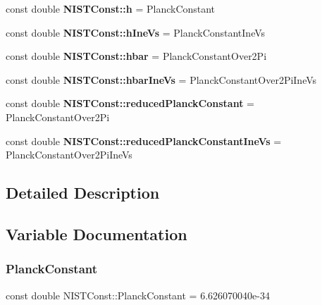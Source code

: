 \begin{DoxyCompactItemize}
\item 
\mbox{\label{group___planck_constant_ga772638524d12d0e8a63abb25441f87a9}} 
const double {\bfseries N\+I\+S\+T\+Const\+::h} = Planck\+Constant
\item 
\mbox{\label{group___planck_constant_gabdd6f21b3e5325e4df4a021ee6b6a506}} 
const double {\bfseries N\+I\+S\+T\+Const\+::h\+Ine\+Vs} = Planck\+Constant\+Ine\+Vs
\item 
\mbox{\label{group___planck_constant_gaec21867afdeb1950b150e667513cd842}} 
const double {\bfseries N\+I\+S\+T\+Const\+::hbar} = Planck\+Constant\+Over2\+Pi
\item 
\mbox{\label{group___planck_constant_gacbb39d7d0090ed14cb725a1d6eaa3fd3}} 
const double {\bfseries N\+I\+S\+T\+Const\+::hbar\+Ine\+Vs} = Planck\+Constant\+Over2\+Pi\+Ine\+Vs
\item 
\mbox{\label{group___planck_constant_ga91e80f15330603015f6f8f8e8f49c926}} 
const double {\bfseries N\+I\+S\+T\+Const\+::reduced\+Planck\+Constant} = Planck\+Constant\+Over2\+Pi
\item 
\mbox{\label{group___planck_constant_gab9efdc081c1c1a03ca7a233d1589b1d8}} 
const double {\bfseries N\+I\+S\+T\+Const\+::reduced\+Planck\+Constant\+Ine\+Vs} = Planck\+Constant\+Over2\+Pi\+Ine\+Vs
\end{DoxyCompactItemize}


\subsection{Detailed Description}


\subsection{Variable Documentation}
\mbox{\label{group___planck_constant_ga6caa482b17de2f08f423eff1a521b0d7}} 
\subsubsection{\texorpdfstring{Planck\+Constant}{PlanckConstant}}
{\footnotesize\ttfamily const double N\+I\+S\+T\+Const\+::\+Planck\+Constant = 6.\+626070040e-\/34}

